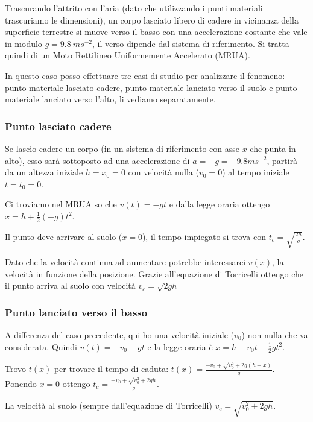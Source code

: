 \documentclass[class=book, crop=false, oneside, 12pt]{standalone}
\begin{document}
Trascurando l'attrito con l'aria (dato che utilizzando i punti materiali
trascuriamo le dimensioni), un corpo lasciato libero di cadere in
vicinanza della superficie terrestre si muove verso il basso con una
accelerazione costante che vale in modulo \(g = 9.8 \ ms^{-2}\), il
verso dipende dal sistema di riferimento. Si tratta quindi di un Moto
Rettilineo Uniformemente Accelerato (MRUA).

In questo caso posso effettuare tre casi di studio per analizzare il
fenomeno: punto materiale lasciato cadere, punto materiale lanciato
verso il suolo e punto materiale lanciato verso l'alto, li vediamo
separatamente.

\subsubsection{Punto lasciato cadere}

Se lascio cadere un corpo (in un sistema di riferimento con asse \(x\)
che punta in alto), esso sarà sottoposto ad una accelerazione di
\(a = -g = -9.8 ms^{-2}\), partirà da un altezza iniziale
\(h = x_0 = 0\) con velocità nulla (\(v_0 = 0\)) al tempo iniziale
\(t = t_0  = 0\).

Ci troviamo nel MRUA so che \(v(t) = -gt\) e dalla legge oraria ottengo
\(x = h + \frac {1} {2} (-g)t^2\).

Il punto deve arrivare al suolo (\(x=0\)), il tempo impiegato si trova
con \(t_c = \sqrt {\frac {2h} {g}}\).

Dato che la velocità continua ad aumentare potrebbe interessarci
\(v(x)\), la velocità in funzione della posizione. Grazie all'equazione
di Torricelli ottengo che il punto arriva al suolo con velocità
\(v_c = \sqrt {2gh}\)

\subsubsection{Punto lanciato verso il basso}

A differenza del caso precedente, qui ho una velocità iniziale (\(v_0\))
non nulla che va considerata. Quindi \(v(t) = -v_0 -gt\) e la legge
oraria è \(x = h - v_0t - \frac {1} {2 } gt^2\).

Trovo \(t(x)\) per trovare il tempo di caduta:
\(t(x) = \frac {-v_0 + \sqrt {v_0^2 + 2g (h-x)}} {g}\). Ponendo \(x=0\)
ottengo \(t_c = \frac {-v_0 + \sqrt {v_0^2 + 2g h}} {g}\).

La velocità al suolo (sempre dall'equazione di Torricelli)
\(v_c = \sqrt {v_0^2 + 2gh}\).
\end{document}
